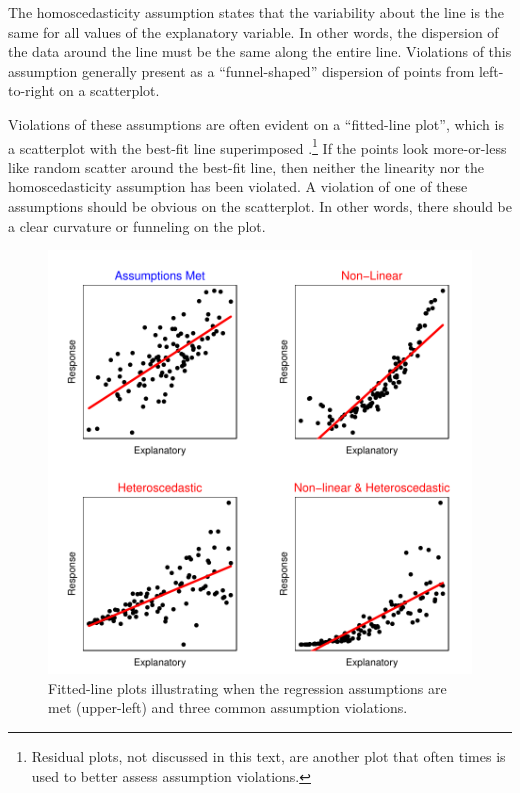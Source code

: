 \documentclass[10pt,openany]{book}\usepackage[]{graphicx}\usepackage[]{color}
\newenvironment{knitrout}{}{} %
\begin{document}
The homoscedasticity assumption states that the variability about the line is the same for all values of the explanatory variable. In other words, the dispersion of the data around the line must be the same along the entire line. Violations of this assumption generally present as a ``funnel-shaped'' dispersion of points from left-to-right on a scatterplot.

Violations of these assumptions are often evident on a ``fitted-line plot'', which is a scatterplot with the best-fit line superimposed .\footnote{Residual plots, not discussed in this text, are another plot that often times is used to better assess assumption violations.} If the points look more-or-less like random scatter around the best-fit line, then neither the linearity nor the homoscedasticity assumption has been violated. A violation of one of these assumptions should be obvious on the scatterplot. In other words, there should be a clear curvature or funneling on the plot.

\begin{knitrout}
\color{fgcolor}\begin{figure}[hbtp]

{\centering \includegraphics[width=.8\linewidth]{Figs/ResidPlotEx-1} 

}

\caption[Fitted-line plots illustrating when the regression assumptions are met (upper-left) and three common assumption violations]{Fitted-line plots illustrating when the regression assumptions are met (upper-left) and three common assumption violations.}\label{fig:ResidPlotEx}
\end{figure}


\end{knitrout}
\vspace{12pt}  %
\end{document}
